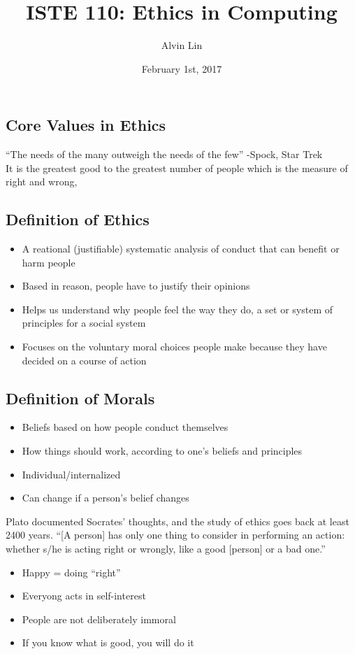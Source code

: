 \documentclass[letterpaper, 12pt]{article}
\title{ISTE 110: Ethics in Computing}
\author{Alvin Lin}
\date{February 1st, 2017}
\begin{document}
\maketitle

\subsection*{Core Values in Ethics}
``The needs of the many outweigh the needs of the few'' -Spock, Star Trek \\
It is the greatest good to the greatest number of people which is the measure of right and wrong,

\subsection*{Definition of Ethics}
\begin{itemize}
  \item A reational (justifiable) systematic analysis of conduct that can
    benefit or harm people
  \item Based in reason, people have to justify their opinions
  \item Helps us understand why people feel the way they do, a set or system of
    principles for a social system
  \item Focuses on the voluntary moral choices people make because they have
    decided on a course of action
\end{itemize}

\subsection*{Definition of Morals}
\begin{itemize}
  \item Beliefs based on how people conduct themselves
  \item How things should work, according to one's beliefs and principles
  \item Individual/internalized
  \item Can change if a person's belief changes
\end{itemize}
Plato documented Socrates' thoughts, and the study of ethics goes back at least 2400 years.
``[A person] has only one thing to consider in performing an action: whether
s/he is acting right or wrongly, like a good [person] or a bad one.''
\begin{itemize}
  \item Happy = doing ``right''
  \item Everyong acts in self-interest
  \item People are not deliberately immoral
  \item If you know what is good, you will do it
\end{itemize}
\end{document}
